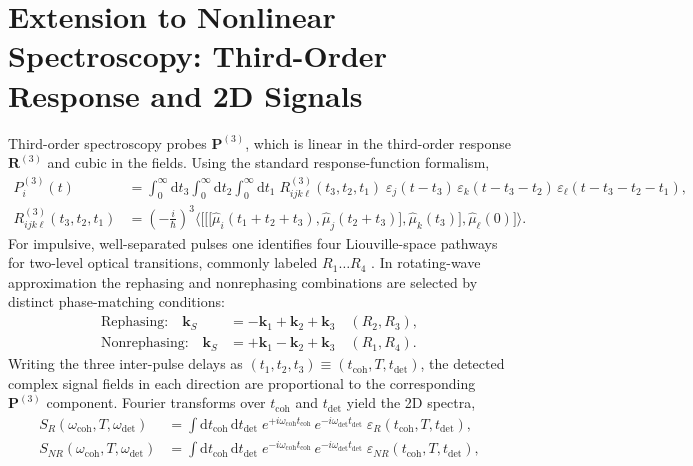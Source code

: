 \section{Extension to Nonlinear Spectroscopy: Third-Order Response and 2D Signals}
\label{copy:sec:third_order}
\noindent
Third-order spectroscopy probes $\boldsymbol{P}^{(3)}$, which is linear in the third-order response $\boldsymbol{R}^{(3)}$ and cubic in the fields. Using the standard response-function formalism,
\begin{align}
    P_i^{(3)}(t)                      & = \int_0^\infty\!\!\mathrm{d}t_3 \int_0^\infty\!\!\mathrm{d}t_2 \int_0^\infty\!\!\mathrm{d}t_1\;
    R^{(3)}_{i j k \ell}(t_3,t_2,t_1)\;
    \varepsilon_j(t-t_3)\,\varepsilon_k(t-t_3-t_2)\,\varepsilon_\ell(t-t_3-t_2-t_1), \label{copy:eq:P3_conv}                             \\
    R^{(3)}_{i j k \ell}(t_3,t_2,t_1) & =
    \left(-\frac{i}{\hbar}\right)^3
    \big\langle
    \big[\!\big[\!\big[\hat{\mu}_i(t_1{+}t_2{+}t_3),\hat{\mu}_j(t_2{+}t_3)\big],\hat{\mu}_k(t_3)\big],\hat{\mu}_\ell(0)\big]
    \big\rangle. \label{copy:eq:R3_def}
\end{align}
For impulsive, well-separated pulses one identifies four Liouville-space pathways for two-level optical transitions, commonly labeled $R_{1}\ldots R_{4}$ \cite{mukamel1995principlesnonlinearoptical, cho2009twodimensionalopticalspectroscopy}. In rotating-wave approximation the rephasing and nonrephasing combinations are selected by distinct phase-matching conditions:
\begin{align}
    \text{Rephasing:}\quad \boldsymbol{k}_S    & = -\boldsymbol{k}_1+\boldsymbol{k}_2+\boldsymbol{k}_3 \quad (R_2,R_3), \\
    \text{Nonrephasing:}\quad \boldsymbol{k}_S & = +\boldsymbol{k}_1-\boldsymbol{k}_2+\boldsymbol{k}_3 \quad (R_1,R_4).
\end{align}
Writing the three inter-pulse delays as $(t_1,t_2,t_3)\equiv(t_{\mathrm{coh}},T,t_{\mathrm{det}})$, the detected complex signal fields in each direction are proportional to the corresponding $\boldsymbol{P}^{(3)}$ component. Fourier transforms over $t_{\mathrm{coh}}$ and $t_{\mathrm{det}}$ yield the 2D spectra,
\begin{align}
    S_{R}(\omega_{\mathrm{coh}},T,\omega_{\mathrm{det}})
     & =\int \mathrm{d}t_{\mathrm{coh}}\,\mathrm{d}t_{\mathrm{det}}\;
    e^{+i\omega_{\mathrm{coh}} t_{\mathrm{coh}}}\,e^{-i\omega_{\mathrm{det}} t_{\mathrm{det}}}\;\varepsilon_{R}(t_{\mathrm{coh}},T,t_{\mathrm{det}}), \label{copy:eq:SR} \\
    S_{NR}(\omega_{\mathrm{coh}},T,\omega_{\mathrm{det}})
     & =\int \mathrm{d}t_{\mathrm{coh}}\,\mathrm{d}t_{\mathrm{det}}\;
    e^{-i\omega_{\mathrm{coh}} t_{\mathrm{coh}}}\,e^{-i\omega_{\mathrm{det}} t_{\mathrm{det}}}\;\varepsilon_{NR}(t_{\mathrm{coh}},T,t_{\mathrm{det}}), \label{copy:eq:SNR}
\end{align}
